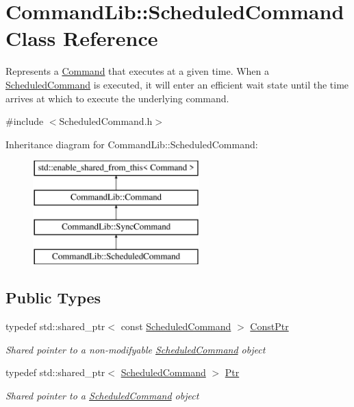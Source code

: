 \hypertarget{class_command_lib_1_1_scheduled_command}{}\section{Command\+Lib\+:\+:Scheduled\+Command Class Reference}
\label{class_command_lib_1_1_scheduled_command}


Represents a \mbox{\hyperlink{class_command_lib_1_1_command}{Command}} that executes at a given time. When a \mbox{\hyperlink{class_command_lib_1_1_scheduled_command}{Scheduled\+Command}} is executed, it will enter an efficient wait state until the time arrives at which to execute the underlying command.  




{\ttfamily \#include $<$Scheduled\+Command.\+h$>$}

Inheritance diagram for Command\+Lib\+:\+:Scheduled\+Command\+:\begin{figure}[H]
\begin{center}
\leavevmode
\includegraphics[height=4.000000cm]{class_command_lib_1_1_scheduled_command}
\end{center}
\end{figure}
\subsection*{Public Types}
\begin{DoxyCompactItemize}
\item 
typedef std\+::shared\+\_\+ptr$<$ const \mbox{\hyperlink{class_command_lib_1_1_scheduled_command}{Scheduled\+Command}} $>$ \mbox{\hyperlink{class_command_lib_1_1_scheduled_command_a67af8cec078bd99c942eb30c60a59a33}{Const\+Ptr}}
\begin{DoxyCompactList}\small\item\em Shared pointer to a non-\/modifyable \mbox{\hyperlink{class_command_lib_1_1_scheduled_command}{Scheduled\+Command}} object\end{DoxyCompactList}\item 
typedef std\+::shared\+\_\+ptr$<$ \mbox{\hyperlink{class_command_lib_1_1_scheduled_command}{Scheduled\+Command}} $>$ \mbox{\hyperlink{class_command_lib_1_1_scheduled_command_ae5efd86637fd8da3ce36b11bc007836d}{Ptr}}
\begin{DoxyCompactList}\small\item\em Shared pointer to a \mbox{\hyperlink{class_command_lib_1_1_scheduled_command}{Scheduled\+Command}} object\end{DoxyCompactList}\end{DoxyCompactItemize}
